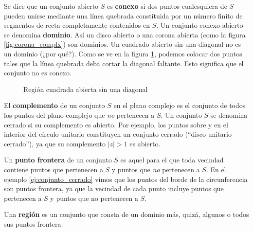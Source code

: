 Se dice que un conjunto abierto $S$ es \textbf{conexo} si dos puntos cualesquiera de $S$ pueden unirse mediante una línea quebrada constituida por un número finito de segmentos de recta completamente contenidos en $S$. Un conjunto conexo abierto se denomina \textbf{dominio}. Así un disco abierto o una corona abierta (como la figura \ref{fig:corona_complx}) son dominios. Un cuadrado abierto sin una diagonal no es un dominio (¿por qué?). Como se ve en la figura \ref{fig:cuadrado_abierto}, podemos colocar dos puntos tales que la línea quebrada deba cortar la diagonal faltante. Esto significa que el conjunto no es conexo.
\begin{figure}[ht]
  \centering
  \caption{Región cuadrada abierta sin una diagonal}
  \label{fig:cuadrado_abierto}
\end{figure}

El \textbf{complemento} de un conjunto $S$ en el plano complejo es el conjunto de todos los puntos del plano complejo que \textit{no} pertenecen a $S$. Un conjunto $S$ se denomina cerrado si su complemento es abierto. Por ejemplo, los puntos sobre y en el interior del círculo unitario constituyen un conjunto cerrado (``disco unitario cerrado''), ya que su complemento $\lvert z \rvert > 1$ es abierto.

Un \textbf{punto frontera} de un conjunto $S$ es aquel para el que toda vecindad contiene puntos que pertenecen a $S$ y puntos que \textit{no} pertenecen a $S$. En el ejemplo \ref{ej:conjunto_cerrado} vimos que los puntos del borde de la circunferencia son puntos frontera, ya que la vecindad de cada punto incluye puntos que pertenecen a $S$ y puntos que no pertenecen a $S$.

Una \textbf{región} es un conjunto que consta de un dominio más, quizá, algunos o todos sus puntos frontera. 
